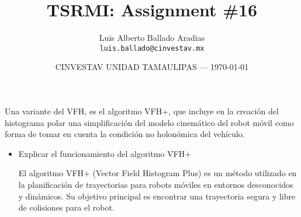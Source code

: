 \documentclass{article}
\title{TSRMI: Assignment \#16} %
\author{Luis Alberto Ballado Aradias\\ \texttt{luis.ballado@cinvestav.mx}} %
\date{CINVESTAV UNIDAD TAMAULIPAS --- \today} %
\begin{document}
\maketitle %


Una variante del VFH, es el algoritmo VFH+, que incluye en la creación del histograma polar una simplificación del modelo cinemático del robot móvil como forma de tomar en cuenta la condición no holonómica del vehículo.\\

\begin{itemize}
  
\item Explicar el funcionamiento del algoritmo VFH+

  El algoritmo VFH+ (Vector Field Histogram Plus) es un método utilizado en la planificación de trayectorias para robots móviles en entornos desconocidos y dinámicos. Su objetivo principal es encontrar una trayectoria segura y libre de colisiones para el robot.\\


\end{itemize}
\end{document}
